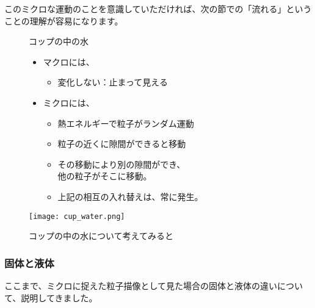 \documentclass[uplatex,dvipdfmx,a4paper,11pt]{jsarticle}
\begin{document}
このミクロな運動のことを意識していただければ、次の節での「流れる」ということの理解が容易になります。
\begin{figure}[htb]
	\begin{center}
		\begin{minipage}{0.55\textwidth}
			\large
			\begin{itembox}[l]{コップの中の水}
				\begin{itemize}
					\item マクロには、
					\begin{itemize}
						\item 変化しない：止まって見える
					\end{itemize}
					\item ミクロには、
					\begin{itemize}
						\item 熱エネルギーで粒子がランダム運動
						\item 粒子の近くに隙間ができると移動
						\item その移動により別の隙間ができ、\\他の粒子がそこに移動。
						\item 上記の相互の入れ替えは、常に発生。
					\end{itemize}
				\end{itemize}
			\end{itembox}
		\end{minipage}
		\begin{minipage}{0.35\textwidth}
			\begin{center}
			\texttt{[image: cup\_water.png]}
			\end{center}
		\end{minipage}
		\caption{コップの中の水について考えてみると}
		\label{}
	\end{center}
\end{figure}

\subsubsection{固体と液体}

ここまで、ミクロに捉えた粒子描像として見た場合の固体と液体の違いについて、説明してきました。
\end{document}
